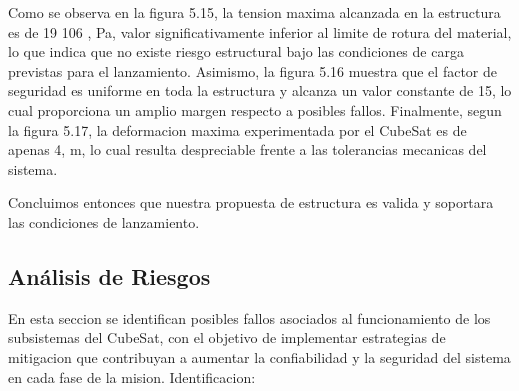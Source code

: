       Como se observa en la figura 5.15, la tension
      maxima alcanzada en la estructura es de 19  106 , Pa, valor significativamente inferior al
      limite de rotura del material, lo que indica que no existe riesgo estructural bajo las
      condiciones de carga previstas para el lanzamiento. Asimismo, la figura 5.16 muestra que el factor
      de seguridad es uniforme en toda la estructura y alcanza un valor constante de 15, lo cual
      proporciona un amplio margen respecto a posibles fallos. Finalmente, segun la figura 5.17,
      la deformacion maxima experimentada por el CubeSat es de apenas 4, m, lo cual resulta
      despreciable frente a las tolerancias mecanicas del sistema.

      Concluimos entonces que nuestra propuesta de estructura es valida y soportara las condiciones de lanzamiento.

  \subsection{Análisis de Riesgos}
    En esta seccion se identifican posibles fallos asociados al funcionamiento de los subsistemas
    del CubeSat, con el objetivo de implementar estrategias de mitigacion que contribuyan a
    aumentar la confiabilidad y la seguridad del sistema en cada fase de la mision. Identificacion:


